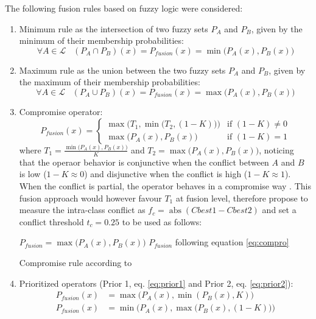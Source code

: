 \documentclass[10pt]{article}
\DeclareMathOperator{\abs}{abs}
\begin{document}
The following fusion rules based on fuzzy logic were considered:
\begin{enumerate}
    \item Minimum rule as the intersection of two fuzzy sets $P_A$ and $P_B$, given by the minimum of their membership probabilities:
    \begin{equation}
        \forall A\in\mathcal{L} \;\;\; (P_A\cap P_B)(x) = P_{fusion}(x) =\min\big(P_A(x),P_B(x)\big)
    \end{equation}
    \item Maximum rule as the union between the two fuzzy sets $P_A$ and $P_B$, given by the maximum of their membership probabilities:
    \begin{equation}
        \forall A\in\mathcal{L} \;\;\; (P_A\cup P_B)(x) = P_{fusion}(x)=\max\big(P_A(x),P_B(x)\big)
    \end{equation}
    \item Compromise operator:
    \begin{equation}\label{eq:compro}
        P_{fusion}(x)=
        \begin{cases}
            \max\Big(T_1,\min\big(T_2,(1-K)\big)\Big)& \text{if } (1-K)\neq 0\\
            \max\Big(P_A(x),P_B(x)\Big) &\text{if }(1-K)= 1
        \end{cases}
    \end{equation}
    where $T_1=\frac{\min\big(P_A(x),P_B(x)\big)}{K}$ and $T_2=\max\big(P_A(x),P_B(x)\big)$, noticing that the operaor behavior is conjunctive when the conflict between $A$ and $B$ is low ($1-K\approx 0$) and disjunctive when the conflict is high ($1-K\approx 1$). When the conflict is partial, the operator behaves in a compromise way \parencite{ouerghemmi_two-step_2017}. This fusion approach would however favour $T_1$ at fusion level, therefore \cite{ouerghemmi_two-step_2017} propose to measure the intra-class conflict as $f_c=\abs(Cbest1-Cbest2)$ and set a conflict threshold $t_c=0.25$ to be used as follows:
    
    \begin{algorithm}[H]
        \begin{algorithmic}
            \State $P_{fusion}=\max\big(P_A(x),P_B(x)\big)$
            \Else
            \State $P_{fusion}$ following equation \ref{eq:compro}
            \EndIf
        \end{algorithmic}
        \caption{Compromise rule according to \cite{ouerghemmi_two-step_2017}}
        \label{alg:comp-wo}
    \end{algorithm}
    \item Prioritized operators (Prior 1, eq. \ref{eq:prior1} and Prior 2, eq. \ref{eq:prior2}):
    \begin{align}
        P_{fusion}(x)&=\max\big(P_A(x),\min(P_B(x),K)\big)\label{eq:prior1}\\
        P_{fusion}(x)&=\min\Big(P_A(x),\max\big(P_B(x),(1-K)\big)\Big)\label{eq:prior2}
    \end{align}
\end{enumerate}
\end{document}
